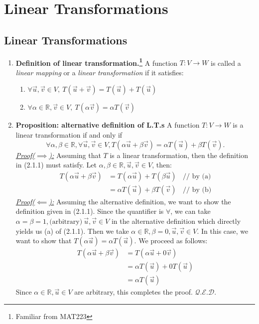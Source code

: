\documentclass[oneside, 12pt]{book}
\newcommand{\settag}[1]{\renewcommand{\theenumi}{#1}}
\newcommand{\R}{\mathbb{R}}
\newcommand{\qed}{\hfill $\mathcal{Q}.\mathcal{E}.\mathcal{D}.$}
\newcommand{\tbf}[1]{\textbf{#1}}
\newcommand{\tit}[1]{\textit{#1}}
\begin{document}
\chapter{Linear Transformations}
\section{Linear Transformations}

    \begin{enumerate}
        \settag{2.1.1}
        \item \tbf{Definition of linear transformation.\footnote{Familiar from MAT223}} A function $T:V\xrightarrow{}W$ is called a \tit{linear mapping} or a \tit{linear transformation} if it satisfies:
        \begin{enumerate}
            \item $\forall \vec{u},\vec{v}\in V,~T(\vec{u} + \vec{v}) = T(\vec{u}) + T(\vec{u})$
            \item $\forall \alpha \in \R, \vec{v} \in V,~ T(\alpha\vec{v}) = \alpha T(\vec{v})$
        \end{enumerate}
        
        \settag{2.1.2}
        \item \tbf{Proposition: alternative definition of L.T.s} A function $T:V\xrightarrow{}W$ is a linear transformation if and only if 
        \begin{equation*}
            \forall \alpha,\beta \in \R, \forall \vec{u}, \vec{v} \in V, T(\alpha \vec{u}+\beta \vec{v})=\alpha T(\vec{u}) + \beta T(\vec{v}).
        \end{equation*}
        \tit{\underline{Proof($\implies$):}}\newline
        Assuming that $T$ is a linear transformation, then the definition in (2.1.1) must satisfy. Let $\alpha,\beta \in \R, \vec{u},\vec{v}\in V$, then: 
        \begin{align*}
            T(\alpha\vec{u} + \beta\vec{v}) &= T(\alpha\vec{u}) + T(\beta\vec{u})~~~~\text{// by (a)} \\
            &= \alpha T(\vec{u}) + \beta T(\vec{v})~~~~\text{// by (b)}
        \end{align*}
        \tit{\underline{Proof($\impliedby$):}}\newline
        Assuming the alternative definition, we want to show the definition given in (2.1.1). Since the quantifier is $\forall$, we can take $\alpha = \beta  =1, \text{(arbitrary)}~\vec{u},\vec{v}\in V$ in the alternative definition which directly yields us (a) of (2.1.1). Then we take $\alpha \in \R, \beta =0, \vec{u}, \vec{v}\in V$. In this case, we want to show that $T(\alpha \vec{u}) = \alpha T(\vec{u})$. We proceed as follows: 
        \begin{align*}
            T(\alpha\vec{u} + \beta\vec{v}) &= T(\alpha\vec{u} + 0\vec{v}) \\
            &= \alpha T(\vec{u}) + 0T(\vec{u}) \\
            &= \alpha T(\vec{u})
        \end{align*}
        Since $\alpha\in \R, \vec{u}\in V$ are arbitrary, this completes the proof. \qed
        

\end{enumerate}
\end{document}
